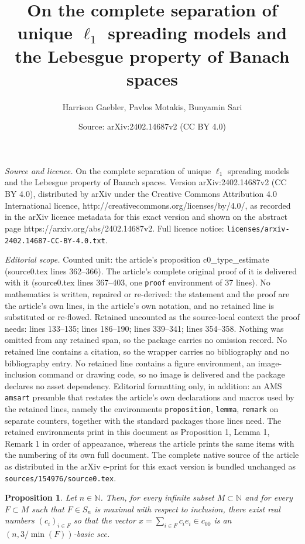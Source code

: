 \documentclass[10pt,a4paper]{amsart}
\title{On the complete separation of unique $\ell_{1}$ spreading models and the Lebesgue property of Banach spaces}
\author{Harrison Gaebler, Pavlos Motakis, Bunyamin Sari}
\date{Source: arXiv:2402.14687v2 (CC BY 4.0)}
\newtheorem{proposition}{Proposition}
\newcommand{\N}{\mathbb{N}}
\begin{document}
\maketitle

\noindent\emph{Source and licence.} On the complete separation of unique $\ell_{1}$ spreading models and the Lebesgue property of Banach spaces. Version arXiv:2402.14687v2 (CC BY 4.0), distributed by arXiv under the Creative Commons Attribution 4.0 International licence, http://creativecommons.org/licenses/by/4.0/, as recorded in the arXiv licence metadata for this exact version and shown on the abstract page https://arxiv.org/abs/2402.14687v2. Full licence notice: \texttt{licenses/arxiv-2402.14687-CC-BY-4.0.txt}.\par\smallskip

\noindent\textit{Editorial scope.} Counted unit: the article's proposition c0\_type\_estimate (source0.tex lines 362--366). The article's complete original proof of it is delivered with it (source0.tex lines 367--403, one \texttt{proof} environment of 37 lines). No mathematics is written, repaired or re-derived: the statement and the proof are the article's own lines, in the article's own notation, and no retained line is substituted or re-flowed.  Retained uncounted as the source-local context the proof needs: lines 133--135; lines 186--190; lines 339--341; lines 354--358.  Nothing was omitted from any retained span, so the package carries no omission record.  No retained line contains a citation, so the wrapper carries no bibliography and no bibliography entry.  No retained line contains a figure environment, an image-inclusion command or drawing code, so no image is delivered and the package declares no asset dependency.  Editorial formatting only, in addition: an AMS \texttt{amsart} preamble that restates the article's own declarations and macros used by the retained lines, namely the environments \texttt{proposition}, \texttt{lemma}, \texttt{remark} on separate counters, together with the standard packages those lines need.  The retained environments print in this document as Proposition 1, Lemma 1, Remark 1 in order of appearance, whereas the article prints the same items with the numbering of its own full document.  The complete native source of the article as distributed in the arXiv e-print for this exact version is bundled unchanged as \texttt{sources/154976/source0.tex}.
\begin{proposition}{\label{basic-scc-maximal}}
Let $n\in\N$. Then, for every infinite subset $M\subset\N$ and for every $F\subset M$ such that $F\in S_{n}$ is maximal with respect to inclusion, there exist real numbers $(c_{i})_{i\in F}$ so that the vector $x=\sum_{i\in F}c_{i}e_{i}\in c_{00}$ is an $(n,3/\min(F))$-basic scc.
\end{proposition}
\end{document}
